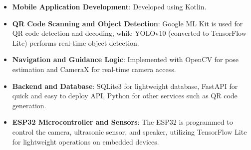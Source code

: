 \begin{itemize}
	\item \textbf{Mobile Application Development}: Developed using Kotlin.
	\item \textbf{QR Code Scanning and Object Detection}: Google ML Kit is used for QR code detection and decoding, while YOLOv10 (converted to TensorFlow Lite) performs real-time object detection.
	\item \textbf{Navigation and Guidance Logic}: Implemented with OpenCV for pose estimation and CameraX for real-time camera access.
	\item \textbf{Backend and Database}: SQLite3 for lightweight database, FastAPI for quick and easy to deploy API, Python for other services such as QR code generation. 
	\item \textbf{ESP32 Microcontroller and Sensors}: The ESP32 is programmed to control the camera, ultrasonic sensor, and speaker, utilizing TensorFlow Lite for lightweight operations on embedded devices.
\end{itemize}


